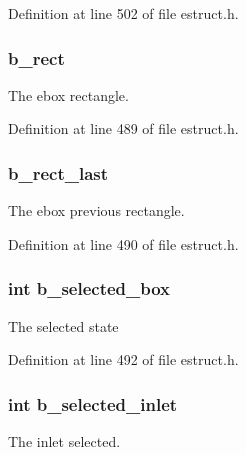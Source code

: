 Definition at line 502 of file estruct.\-h.

\hypertarget{struct__edspbox_abc70ff46c135ee9f377a038bbc05a33e}{
\subsubsection[{b\-\_\-rect}]{ b\-\_\-rect}}\label{struct__edspbox_abc70ff46c135ee9f377a038bbc05a33e}
The ebox rectangle. 

Definition at line 489 of file estruct.\-h.

\hypertarget{struct__edspbox_a2a0a15d3bc005cd4f815088b230b5ebd}{
\subsubsection[{b\-\_\-rect\-\_\-last}]{ b\-\_\-rect\-\_\-last}}\label{struct__edspbox_a2a0a15d3bc005cd4f815088b230b5ebd}
The ebox previous rectangle. 

Definition at line 490 of file estruct.\-h.

\hypertarget{struct__edspbox_acc1a127070b19ccf6e222d7349c84c96}{
\subsubsection[{b\-\_\-selected\-\_\-box}]{\setlength{\rightskip}{0pt plus 5cm}int b\-\_\-selected\-\_\-box}}\label{struct__edspbox_acc1a127070b19ccf6e222d7349c84c96}
The selected state 

Definition at line 492 of file estruct.\-h.

\hypertarget{struct__edspbox_a0cebb4789c213079e0490e86c10c2893}{
\subsubsection[{b\-\_\-selected\-\_\-inlet}]{\setlength{\rightskip}{0pt plus 5cm}int b\-\_\-selected\-\_\-inlet}}\label{struct__edspbox_a0cebb4789c213079e0490e86c10c2893}
The inlet selected. 

